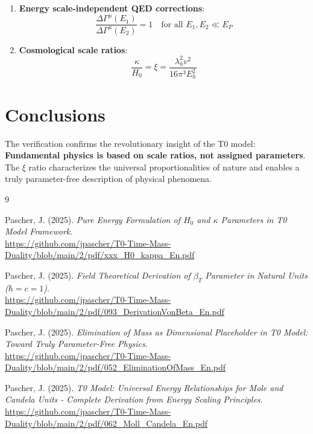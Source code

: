	\begin{enumerate}
		\item \textbf{Energy scale-independent QED corrections}:
		\begin{equation}
			\frac{\Delta\Gamma^{\mu}(E_1)}{\Delta\Gamma^{\mu}(E_2)} = 1 \quad \text{for all } E_1, E_2 \ll E_P
		\end{equation}
		
		\item \textbf{Cosmological scale ratios}:
		\begin{equation}
			\frac{\kappa}{H_0} = \xi = \frac{\lambda_h^2 v^2}{16\pi^3 E_h^2}
		\end{equation}
	\end{enumerate}
	
	\section{Conclusions}
	
	The verification confirms the revolutionary insight of the T0 model: \textbf{Fundamental physics is based on scale ratios, not assigned parameters}. The $\xi$ ratio characterizes the universal proportionalities of nature and enables a truly parameter-free description of physical phenomena.
	
	\begin{thebibliography}{9}
		
		Pascher, J. (2025). \textit{Pure Energy Formulation of $H_0$ and $\kappa$ Parameters in T0 Model Framework}. \\
		\url{https://github.com/jpascher/T0-Time-Mass-Duality/blob/main/2/pdf/xxx_H0_kappa_En.pdf}
		
		Pascher, J. (2025). \textit{Field Theoretical Derivation of $\beta_T$ Parameter in Natural Units ($\hbar = c = 1$)}. \\
		\url{https://github.com/jpascher/T0-Time-Mass-Duality/blob/main/2/pdf/093_DerivationVonBeta_En.pdf}
		
		Pascher, J. (2025). \textit{Elimination of Mass as Dimensional Placeholder in T0 Model: Toward Truly Parameter-Free Physics}. \\
		\url{https://github.com/jpascher/T0-Time-Mass-Duality/blob/main/2/pdf/052_EliminationOfMass_En.pdf}
		
		Pascher, J. (2025). \textit{T0 Model: Universal Energy Relationships for Mole and Candela Units - Complete Derivation from Energy Scaling Principles}. \\
		\url{https://github.com/jpascher/T0-Time-Mass-Duality/blob/main/2/pdf/062_Moll_Candela_En.pdf}
		
	\end{thebibliography}
